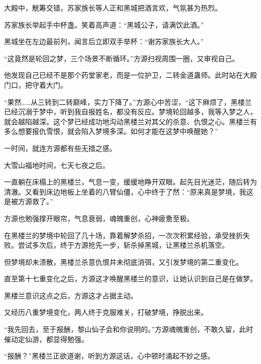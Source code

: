 \begin{this_body}
大殿中，觥筹交错，苏家族长等人正和黑城把酒言欢，气氛甚为热烈。

苏家族长举起手中杯盏。笑着高声道：“黑城公子，请满饮此酒。”

黑城坐在左边最前列，闻言后立即双手举杯：“谢苏家族长大人。”

“这竟然是轮回之梦，三个场景不断循环。”方源扫视周围一圈，又审视自己。

他发现自己已经不是那个药堂家老，而是一位护卫，二转金道蛊师。此时站在大殿门口，把守着大门。

“果然……从三转到二转巅峰，实力下降了。”方源心中苦涩，“这下麻烦了，黑楼兰已经沉溺于梦中，听到我自报姓名，都没有反应。梦境轮回越多，我等入梦之人，就会越陷越深。这个梦已经成功地沟动黑楼兰对其父的杀意、仇恨之心。黑楼兰有多么想要报仇雪恨，就会陷入梦境多深。如何才能在这梦中唤醒她？”

一时间，就连方源都有些无措之感。

大雪山福地时间，七天七夜之后。

一直躺在床榻上的黑楼兰，气息一变，缓缓地睁开双眼。起先目光迷茫，随后转为清澈。又看到床边地板上坐着的八臂仙僵，心中终于了然：“原来真是梦境，我这是被方源救了。”

方源也勉强撑开眼帘，气息衰弱，魂魄重创，心神疲惫至极。

在黑楼兰的梦境中轮回了几十场，靠着解梦杀招，一次次积累经验，承受挫折失败。尝试多次后，终于方源抢先一步，斩杀掉黑城，让黑楼兰杀机落空。

但梦境却未溃散，黑楼兰杀意仇恨并未彻底消弭，又引发梦境的第二重变化。

直至第十七重变化之后，方源这才唤醒黑楼兰的意识，让她认识到自己是在做梦。

黑楼兰意识这点之后，方源这才占据主动。

又经历八重梦境变化，两人终于克服难关，打破梦境，挣脱出来。

“我先回去，至于报酬，黎山仙子会和你说明的。”方源魂魄重创，不敢久留，此时催动定仙游，都显得勉强。

“报酬？”黑楼兰正欲道谢，听到方源这话，心中顿时涌起不妙之感。

\end{this_body}

